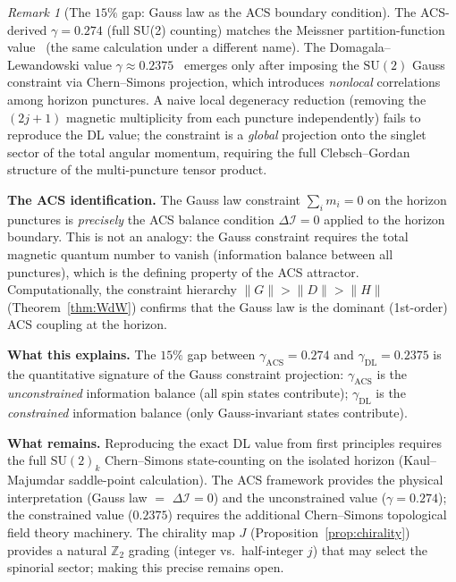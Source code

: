\documentclass[11pt,a4paper]{article}
\theoremstyle{plain}
\theoremstyle{definition}
\theoremstyle{remark}
\newtheorem{remark}[theorem]{Remark}
\newcommand{\DI}{\Delta\mathcal{I}}
\begin{document}
\begin{remark}[The $15\%$ gap: Gauss law as the ACS boundary condition]\label{rem:gamma-gap}
The ACS-derived $\gamma = 0.274$ (full SU(2) counting) matches the
Meissner partition-function value~\cite{Meissner2004} (the same calculation under a different name).
The Domagala--Lewandowski value $\gamma \approx 0.2375$~\cite{Domagala2004}
emerges only after imposing the $\mathrm{SU}(2)$ Gauss constraint
via Chern--Simons projection, which introduces \emph{nonlocal}
correlations among horizon punctures.  A naive local degeneracy
reduction (removing the $(2j{+}1)$ magnetic multiplicity from
each puncture independently) fails to reproduce the DL value; the
constraint is a \emph{global} projection onto the singlet sector of
the total angular momentum, requiring the full Clebsch--Gordan
structure of the multi-puncture tensor product.

\medskip
\noindent\textbf{The ACS identification.}
The Gauss law constraint $\sum_i m_i = 0$ on the horizon punctures
is \emph{precisely} the ACS balance condition $\DI = 0$ applied to
the horizon boundary.  This is not an analogy: the Gauss constraint
requires the total magnetic quantum number to vanish (information
balance between all punctures), which is the defining property of the
ACS attractor.  Computationally, the constraint hierarchy
$\|G\| > \|D\| > \|H\|$ (Theorem~\ref{thm:WdW}) confirms that
the Gauss law is the dominant (1st-order) ACS coupling at the horizon.

\medskip
\noindent\textbf{What this explains.}
The $15\%$ gap between $\gamma_{\mathrm{ACS}} = 0.274$ and
$\gamma_{\mathrm{DL}} = 0.2375$ is the quantitative signature of
the Gauss constraint projection:
$\gamma_{\mathrm{ACS}}$ is the \emph{unconstrained} information balance
(all spin states contribute); $\gamma_{\mathrm{DL}}$ is the
\emph{constrained} information balance (only Gauss-invariant states contribute).

\medskip
\noindent\textbf{What remains.}
Reproducing the exact DL value from first principles requires the full
$\mathrm{SU}(2)_k$ Chern--Simons state-counting on the isolated horizon
(Kaul--Majumdar saddle-point calculation).  The ACS framework provides
the physical interpretation (Gauss law $=$ $\DI = 0$) and the unconstrained
value ($\gamma = 0.274$); the constrained value ($0.2375$) requires
the additional Chern--Simons topological field theory machinery.
The chirality map $J$ (Proposition~\ref{prop:chirality}) provides a
natural $\mathbb{Z}_2$ grading (integer vs.\ half-integer $j$) that
may select the spinorial sector; making this precise remains open.
\end{remark}
\end{document}

